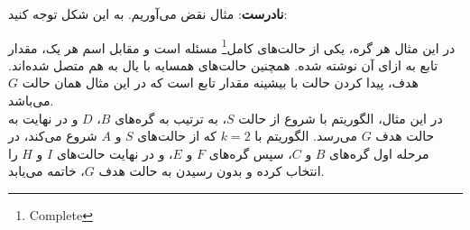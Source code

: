 \begin{ابجد}
\item \textbf{نادرست}: مثال نقض می‌آوریم. به این شکل توجه کنید:
\begin{latin}
    \begin{center}
    \end{center}
\end{latin}
در این مثال هر گره، یکی از حالت‌های کامل\footnote{Complete} مسئله است و مقابل اسم هر یک، مقدار تابع  به ازای آن نوشته شده. همچنین حالت‌های همسایه با یال به هم متصل شده‌اند. هدف، پیدا کردن حالت با بیشینه مقدار تابع  است که در این مثال همان حالت $G$ می‌باشد. \\
در این مثال، الگوریتم  با شروع از حالت $S$، به ترتیب به گره‌های $B$، $D$ و در نهایت به حالت هدف $G$ می‌رسد. الگوریتم  با $k=2$ که از حالت‌های $S$ و $A$ شروع می‌کند، در مرحله اول گره‌های $B$ و $C$، سپس گره‌های $F$ و $E$، و در نهایت حالت‌های $I$ و $H$ را انتخاب کرده و بدون رسیدن به حالت هدف $G$، خاتمه می‌یابد.

\end{ابجد}